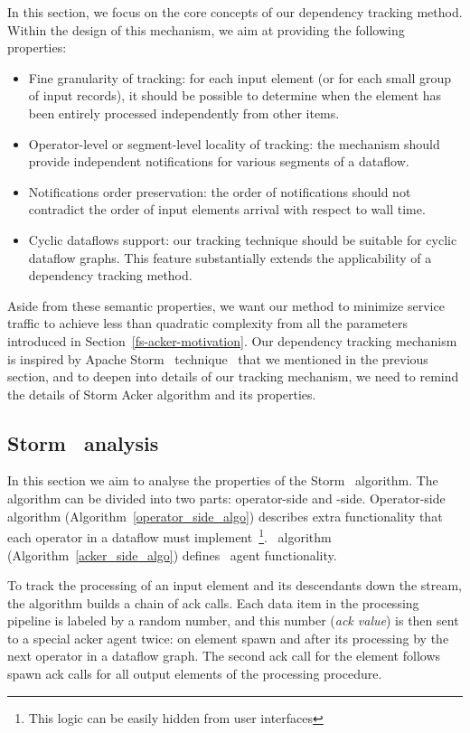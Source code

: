 In this section, we focus on the core concepts of our dependency tracking method. Within the design of this mechanism, we aim at providing the following properties:
\begin{itemize}
    \item Fine granularity of tracking: for each input element (or for each small group of input records), it should be possible to determine when the element has been entirely processed independently from other items.
    \item Operator-level or segment-level locality of tracking: the mechanism should provide independent notifications for various segments of a dataflow.
    \item Notifications order preservation: the order of notifications should not contradict the order of input elements arrival with respect to wall time.
    \item Cyclic dataflows support: our tracking technique should be suitable for cyclic dataflow graphs. This feature substantially extends the applicability of a dependency tracking method.
\end{itemize}
Aside from these semantic properties, we want our method to minimize service traffic to achieve less than quadratic complexity from all the parameters introduced in Section~\ref{fs-acker-motivation}.
Our dependency tracking mechanism is inspired by Apache Storm \acker\ technique~\cite{apache:storm:acker} that we mentioned in the previous section, and to deepen into details of our tracking mechanism, we need to remind the details of Storm Acker algorithm and its properties. 

\subsection{Storm \acker~analysis}
\label{sec:acker-analysis}
In this section we aim to analyse the properties of the Storm \acker\ algorithm. The algorithm can be divided into two parts: operator-side and \acker -side. Operator-side algorithm (Algorithm~\ref{operator_side_algo}) describes extra functionality that each operator in a dataflow must implement~\footnote{This logic can be easily hidden from user interfaces}. \acker\ algorithm (Algorithm~\ref{acker_side_algo}) defines \acker\ agent functionality.

To track the processing of an input element and its descendants down the stream, the algorithm builds a chain of ack calls. Each data item in the processing pipeline is labeled by a random number, and this number (\textit{ack value}) is then sent to a special acker agent twice: on element spawn and after its processing by the next operator in a dataflow graph. The second ack call for the element follows spawn ack calls for all output elements of the processing procedure. 


